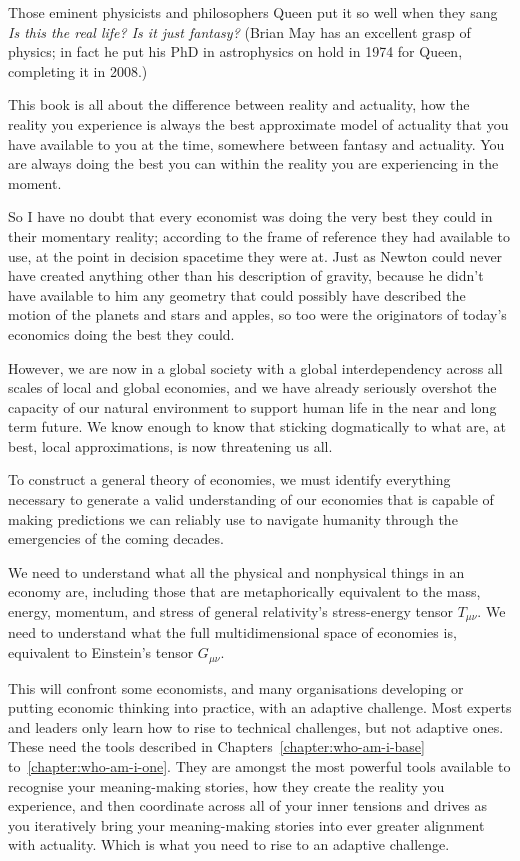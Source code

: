 Those eminent physicists and philosophers Queen put it so well when they sang \emph{Is this the real life? Is it just fantasy?} (Brian May has an excellent grasp of physics; in fact he put his PhD in astrophysics on hold in 1974 for Queen, completing it in 2008.)


This book is all about the difference between reality  and actuality,  how the reality you experience is always the best approximate model of actuality that you have available to you at the time, somewhere between fantasy and actuality. You are always doing the best you can within the reality you are experiencing in the moment.


So I have no doubt that every economist was doing the very best they could in their momentary reality; according to the frame of reference they had available to use, at the point in decision spacetime they were at. Just as Newton  could never have created anything other than his description of gravity, because he didn’t have available to him any geometry that could possibly have described the motion of the planets and stars and apples, so too were the originators of today's economics doing the best they could.


However, we are now in a global society with a global interdependency across all scales of local and global economies, and we have already seriously overshot the capacity of our natural environment to support human life in the near and long term future. We know enough to know that sticking dogmatically to what are, at best, local approximations, is now threatening us all.


To construct a general theory of economies, we must identify everything necessary to generate a valid understanding of our economies that is capable of making predictions we can reliably use to navigate humanity through the emergencies of the coming decades.


We need to understand what all the physical and nonphysical things in an economy are, including those that are metaphorically equivalent to the mass, energy, momentum, and stress of general relativity's stress\hyp{}energy tensor $T_{\mu\nu}$. We need to understand what the full multidimensional space of economies is, equivalent to Einstein's tensor  $G_{\mu\nu}$. 


This will confront some economists,  and many organisations developing or putting economic thinking into practice, with an adaptive challenge. Most experts and leaders only learn how to rise to technical challenges, but not adaptive ones. These need the tools described in Chapters~\ref{chapter:who-am-i-base} to~\ref{chapter:who-am-i-one}. They are amongst the most powerful tools available to recognise your meaning\hyp{}making stories, how they create the reality you experience, and then coordinate across all of your inner tensions and drives as you iteratively bring your meaning\hyp{}making stories into ever greater alignment with actuality. Which is what you need to rise to an adaptive challenge.


